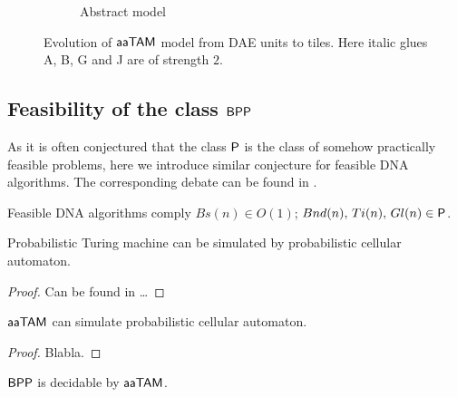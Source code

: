 \begin{figure}[H]
\begin{center}
\begin{subfigure}[b]{0.190\textwidth}
		\caption{Abstract model}
		\label{fig:abstract_model}
	\end{subfigure}
	\caption{Evolution of $\myatam$ model from DAE units to tiles. Here italic glues {\sf A}, {\sf B}, {\sf G} and {\sf J} are of strength $2$.} %
	\label{fig:evolution}
\end{center}
\end{figure}

\subsection{Feasibility of the class $\BPP$}
	
	As it is often conjectured that the class $\P$ is the class of somehow practically feasible problems, here we introduce similar conjecture for feasible DNA algorithms. The corresponding debate can be found in \cite{book_comp}. %
	
	\begin{conj}   %
		Feasible DNA algorithms comply $Bs(n)\in O(1)$; $Bnd(n),\,Ti(n),\,Gl(n)\in \P$.   %
	\end{conj}
	
	\begin{thm}   %
		Probabilistic Turing machine can be simulated by probabilistic cellular automaton.
	\end{thm}
	
	\begin{proof}
		Can be found in \ldots
	\end{proof}
	
	\begin{thm}   %
		$\myatam$ can simulate probabilistic cellular automaton.
	\end{thm}
	
	\begin{proof}
		Blabla. %
	\end{proof}
	
	\begin{cor}
		$\BPP$ is decidable by $\myatam$.
	\end{cor}
	
